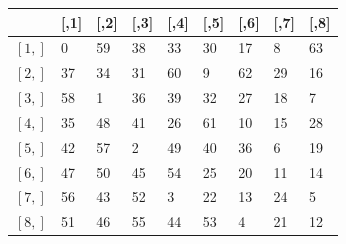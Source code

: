 \documentclass[12pt,letterpaper]{article}
\begin{document}
\begin{enumerate}[label=\Alph*]
\begin{table}[H]\centering
	\begin{tabular}{@{}l|llllllll@{}}
		\toprule
		       & [,1] & [,2] & [,3] & [,4] & [,5] & [,6] & [,7] & [,8] \\ \midrule
		$[1,]$ & 0 	  & 59   & 38   & 33   & 30  & 17    & 8    & 63   \\
		$[2,]$ & 37   & 34   & 31   & 60   & 9   & 62    & 29   & 16   \\
		$[3,]$ & 58   & 1    & 36   & 39   & 32  & 27    & 18   & 7    \\
		$[4,]$ & 35   & 48   & 41   & 26   & 61  & 10    & 15   & 28   \\
		$[5,]$ & 42   & 57   & 2    & 49   & 40  & 36    & 6    & 19   \\
		$[6,]$ & 47   & 50   & 45   & 54   & 25  & 20    & 11   & 14   \\
		$[7,]$ & 56   & 43   & 52   & 3    & 22  & 13    & 24   & 5    \\
		$[8,]$ & 51   & 46   & 55   & 44   & 53  & 4     & 21   & 12   \\ \bottomrule
	\end{tabular}
\end{table}

\end{enumerate}
\end{document}
